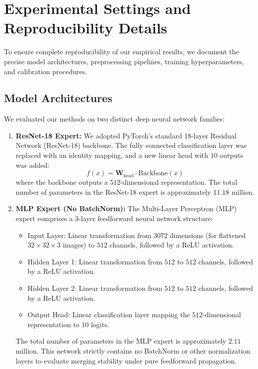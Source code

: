 \documentclass{article}
\theoremstyle{plain}
\theoremstyle{definition}
\theoremstyle{remark}
\begin{document}
\section{Experimental Settings and Reproducibility Details}
\label{sec:appendix_experimental}

To ensure complete reproducibility of our empirical results, we document the precise model architectures, preprocessing pipelines, training hyperparameters, and calibration procedures.

\subsection{Model Architectures}
We evaluated our methods on two distinct deep neural network families:
\begin{enumerate}
  \item \textbf{ResNet-18 Expert:} We adopted PyTorch's standard 18-layer Residual Network (ResNet-18) backbone. The fully connected classification layer was replaced with an identity mapping, and a new linear head with $10$ outputs was added:
  \begin{equation}
    f(x) = \mathbf{W}_{\mathrm{head}} \cdot \mathrm{Backbone}(x)
  \end{equation}
  where the backbone outputs a $512$-dimensional representation. The total number of parameters in the ResNet-18 expert is approximately $11.18$ million.
  \item \textbf{MLP Expert (No BatchNorm):} The Multi-Layer Perceptron (MLP) expert comprises a 3-layer feedforward neural network structure:
  \begin{itemize}
    \item Input Layer: Linear transformation from $3072$ dimensions (for flattened $32 \times 32 \times 3$ images) to $512$ channels, followed by a ReLU activation.
    \item Hidden Layer 1: Linear transformation from $512$ to $512$ channels, followed by a ReLU activation.
    \item Hidden Layer 2: Linear transformation from $512$ to $512$ channels, followed by a ReLU activation.
    \item Output Head: Linear classification layer mapping the $512$-dimensional representation to $10$ logits.
  \end{itemize}
  The total number of parameters in the MLP expert is approximately $2.11$ million. This network strictly contains no BatchNorm or other normalization layers to evaluate merging stability under pure feedforward propagation.
\end{enumerate}
\end{document}
